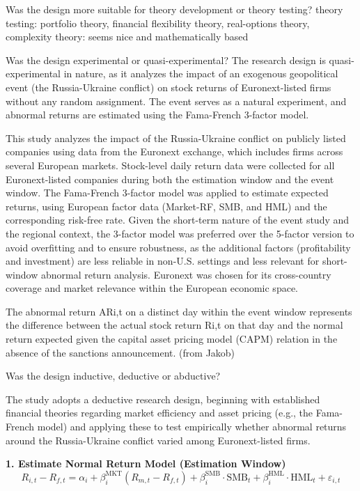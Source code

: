 \documentclass[12pt,a4paper]{article}
\begin{document}
Was the design more suitable for theory development or theory testing?
theory testing: portfolio theory, financial flexibility theory, real-options theory,
complexity theory: seems nice and mathematically based


Was the design experimental or quasi-experimental?
The research design is quasi-experimental in nature, as it analyzes the impact of an exogenous geopolitical event (the Russia-Ukraine conflict) on stock returns of Euronext-listed firms without any random assignment. The event serves as a natural experiment, and abnormal returns are estimated using the Fama-French 3-factor model.

This study analyzes the impact of the Russia-Ukraine conflict on publicly listed companies using data from the Euronext exchange, which includes firms across several European markets. Stock-level daily return data were collected for all Euronext-listed companies during both the estimation window and the event window. The Fama-French 3-factor model was applied to estimate expected returns, using European factor data (Market-RF, SMB, and HML) and the corresponding risk-free rate. Given the short-term nature of the event study and the regional context, the 3-factor model was preferred over the 5-factor version to avoid overfitting and to ensure robustness, as the additional factors (profitability and investment) are less reliable in non-U.S. settings and less relevant for short-window abnormal return analysis. Euronext was chosen for its cross-country coverage and market relevance within the European economic space.

The abnormal return ARi,t on a distinct day within the event window represents the difference between the actual stock return Ri,t on that day and the normal return expected given the capital asset pricing model (CAPM) relation in the absence of the sanctions announcement. (from Jakob)

Was the design inductive, deductive or abductive?

The study adopts a deductive research design, beginning with established financial theories regarding market efficiency and asset pricing (e.g., the Fama-French model) and applying these to test empirically whether abnormal returns around the Russia-Ukraine conflict varied among Euronext-listed firms.


\textbf{1. Estimate Normal Return Model (Estimation Window)}
\begin{equation}
R_{i,t} - R_{f,t} = \alpha_i + \beta_i^{\text{MKT}} (R_{m,t} - R_{f,t}) + \beta_i^{\text{SMB}} \cdot \text{SMB}_t + \beta_i^{\text{HML}} \cdot \text{HML}_t + \varepsilon_{i,t}
\end{equation}
\end{document}
